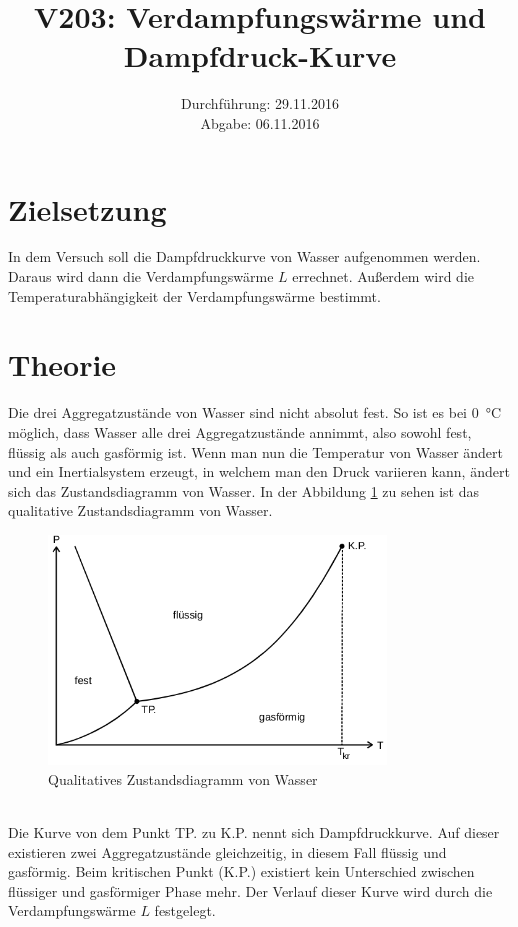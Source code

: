 \documentclass[
  bibliography=totoc,     %
  captions=tableheading,  %
  titlepage=firstiscover, %
]{scrartcl}
\title{V203: Verdampfungswärme und Dampfdruck-Kurve}
\author{
  Simon Schulte
  \texorpdfstring{
    \\
    \href{mailto:simon.schulte@udo.edu}{simon.schulte@udo.edu}
  }{}
  \texorpdfstring{\and}{, }
  Tim Sedlaczek
  \texorpdfstring{
    \\
    \href{mailto:tim.sedlaczek@udo.edu}{tim.sedlaczek@udo.edu}
  }{}
}
\date{Durchführung: 29.11.2016\\
      Abgabe: 06.11.2016}
\begin{document}
\newpage
\maketitle
\tableofcontents
\newpage

\section{Zielsetzung}
\label{sec:zielsetzung}
In dem Versuch soll die Dampfdruckkurve von Wasser aufgenommen werden. Daraus
wird dann die Verdampfungswärme $L$ errechnet. Außerdem wird die
Temperaturabhängigkeit der Verdampfungswärme bestimmt.
\section{Theorie}
\label{sec:theorie}
Die drei Aggregatzustände von Wasser sind nicht absolut fest. So ist es bei
\SI{0}{\celsius} möglich, dass Wasser alle drei Aggregatzustände annimmt, also
sowohl fest, flüssig als auch gasförmig ist. Wenn man nun die Temperatur von
Wasser ändert und ein Inertialsystem erzeugt, in welchem man den Druck variieren
kann, ändert sich das Zustandsdiagramm von Wasser. In der Abbildung \ref{fig:aggregatzustände}
zu sehen ist das qualitative Zustandsdiagramm von Wasser.
\begin{figure}[htb]
  \centering
  \includegraphics[width=0.8\textwidth]{Aggregatzustände.png}
  \caption{Qualitatives Zustandsdiagramm von Wasser \cite{anleitung}}
  \label{fig:aggregatzustände}
\end{figure}\\
Die Kurve von dem Punkt TP. zu K.P. nennt sich Dampfdruckkurve. Auf dieser
existieren zwei Aggregatzustände gleichzeitig, in diesem Fall flüssig und
gasförmig. Beim kritischen Punkt (K.P.) existiert kein Unterschied zwischen
flüssiger und gasförmiger Phase mehr. Der Verlauf dieser Kurve wird durch die
Verdampfungswärme $L$ festgelegt.
\end{document}

